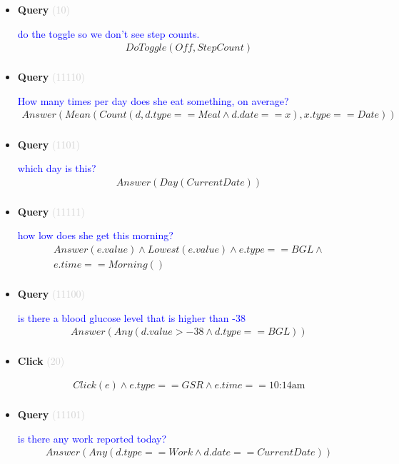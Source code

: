 \documentclass[11pt]{article}
\newcommand{\key}[1]{\textcolor{lightgray}{#1}}
\newcounter{CQuery}
\newcounter{CClick}
\begin{document}
\begin{itemize}
\item
\textbf{Query\theCQuery} \key{(10)} \addtocounter{CQuery}{1}
\textcolor{blue}{ do the toggle so we don't see step counts. }
\begin{multline*}
DoToggle(Off, StepCount) \\ 
\end{multline*}


\item
\textbf{Query\theCQuery} \key{(11110)} \addtocounter{CQuery}{1}
\textcolor{blue}{ How many times per day does she eat something, on average? }
\begin{multline*}
Answer(Mean(Count(d, d.type==Meal \wedge d.date==x), x.type==Date)) \\ 
\end{multline*}


\item
\textbf{Query\theCQuery} \key{(1101)} \addtocounter{CQuery}{1}
\textcolor{blue}{ which day is this? }
\begin{multline*}
Answer(Day(CurrentDate)) \\ 
\end{multline*}


\item
\textbf{Query\theCQuery} \key{(11111)} \addtocounter{CQuery}{1}
\textcolor{blue}{ how low does she get this morning? }
\begin{multline*}
Answer(e.value) \wedge Lowest(e.value) \wedge e.type==BGL \wedge \\ 
e.time==Morning() \\ 
\end{multline*}


\item
\textbf{Query\theCQuery} \key{(11100)} \addtocounter{CQuery}{1}
\textcolor{blue}{ is there a blood glucose level that is higher than -38 }
\begin{multline*}
Answer(Any(d.value>-38 \wedge d.type==BGL)) \\ 
\end{multline*}


\item
\textbf{Click\theCClick} \key{(20)} \addtocounter{CClick}{1}
\textcolor{blue}{  }
\begin{multline*}
Click(e) \wedge e.type==GSR \wedge e.time==\mbox{10:14am} \\ 
\end{multline*}


\item
\textbf{Query\theCQuery} \key{(11101)} \addtocounter{CQuery}{1}
\textcolor{blue}{ is there any work reported today? }
\begin{multline*}
Answer(Any(d.type==Work \wedge d.date==CurrentDate)) \\ 
\end{multline*}



\end{itemize}
\end{document}
